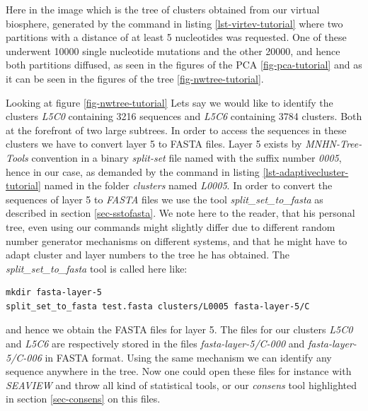 Here in the image which is the tree of clusters obtained from our
virtual biosphere, generated by the command in listing
\ref{lst-virtev-tutorial} where two partitions with a distance of at
least 5 nucleotides was requested. One of these underwent 10000 single
nucleotide mutations and the other 20000, and hence both partitions
diffused, as seen in the figures of the PCA \ref{fig-pca-tutorial} and as it
can be seen in the figures of the tree \ref{fig-nwtree-tutorial}.

Looking at figure \ref{fig-nwtree-tutorial}
Lets say we would like to identify the clusters \emph{L5C0} containing
3216 sequences and \emph{L5C6} containing 3784 clusters. Both at the
forefront of two large subtrees. In order to access the sequences in
these clusters we have to convert layer 5 to FASTA files. Layer 5
exists by \emph{MNHN-Tree-Tools} convention in a binary \emph{split-set}
file named with the suffix number \emph{0005}, hence in our case, as
demanded by the command in listing \ref{lst-adaptivecluster-tutorial}
named in the folder \emph{clusters} named \emph{L0005}. In order to
convert the sequences of layer 5 to \emph{FASTA} files we use the
tool \emph{split\_set\_to\_fasta} as described in section
\ref{sec-sstofasta}. We note here to the reader, that his personal tree, even
using our commands might slightly differ due to different random
number generator mechanisms on different systems, and that he might
have to adapt cluster and layer numbers to the tree he has obtained. 
The \emph{split\_set\_to\_fasta} tool is called here like:
\begin{lstlisting}
mkdir fasta-layer-5
split_set_to_fasta test.fasta clusters/L0005 fasta-layer-5/C
\end{lstlisting}
and hence we obtain the FASTA files for layer 5. The files for our
clusters \emph{L5C0} and \emph{L5C6} are respectively stored in the
files \emph{fasta-layer-5/C-000} and \emph{fasta-layer-5/C-006} in
FASTA format. Using the same mechanism we can identify any sequence
anywhere in the tree. Now one could open these files for instance with
\emph{SEAVIEW} and throw all kind of statistical tools, or our
\emph{consens} tool highlighted in section \ref{sec-consens} on this
files.

